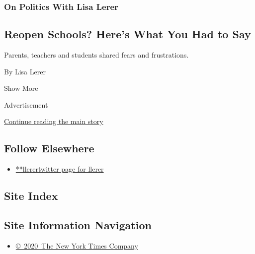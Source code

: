 \begin{enumerate}
  \hypertarget{on-politics-with-lisa-lerer-6}{%
  \subsubsection{On Politics With Lisa
  Lerer}\label{on-politics-with-lisa-lerer-6}}

  \hypertarget{reopen-schools-heres-what-you-had-to-say}{%
  \subsection{Reopen Schools? Here's What You Had to
  Say}\label{reopen-schools-heres-what-you-had-to-say}}

  Parents, teachers and students shared fears and frustrations.

  By Lisa Lerer
\end{enumerate}

Show More

Advertisement

\protect\hyperlink{after-mid2}{Continue reading the main story}

\hypertarget{follow-elsewhere}{%
\subsection{Follow Elsewhere}\label{follow-elsewhere}}

\begin{itemize}
\tightlist
\item
  \href{https://twitter.com/llerer}{**llerertwitter page for llerer}
\end{itemize}

\hypertarget{site-index}{%
\subsection{Site Index}\label{site-index}}

\hypertarget{site-information-navigation}{%
\subsection{Site Information
Navigation}\label{site-information-navigation}}

\begin{itemize}
\tightlist
\item
  \href{https://help.nytimes.com/hc/en-us/articles/115014792127-Copyright-notice}{©~2020~The
  New York Times Company}
\end{itemize}

